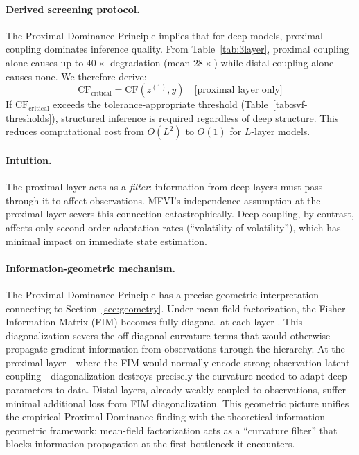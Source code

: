 \documentclass[10pt]{article} %
\theoremstyle{plain}
\theoremstyle{definition}
\begin{document}
\paragraph{Derived screening protocol.} The Proximal Dominance Principle implies that for deep models, proximal coupling dominates inference quality. From Table~\ref{tab:3layer}, proximal coupling alone causes up to $40\times$ degradation (mean $28\times$) while distal coupling alone causes none. We therefore derive:
\begin{equation}
\text{CF}_{\text{critical}} = \text{CF}(z^{(1)}, y) \quad \text{[proximal layer only]}
\end{equation}
If $\text{CF}_{\text{critical}}$ exceeds the tolerance-appropriate threshold (Table~\ref{tab:svf-thresholds}), structured inference is required regardless of deep structure. This reduces computational cost from $O(L^2)$ to $O(1)$ for $L$-layer models.

\paragraph{Intuition.} The proximal layer acts as a \emph{filter}: information from deep layers must pass through it to affect observations. MFVI's independence assumption at the proximal layer severs this connection catastrophically. Deep coupling, by contrast, affects only second-order adaptation rates (``volatility of volatility''), which has minimal impact on immediate state estimation.

\paragraph{Information-geometric mechanism.} The Proximal Dominance Principle has a precise geometric interpretation connecting to Section~\ref{sec:geometry}. Under mean-field factorization, the Fisher Information Matrix (FIM) becomes fully diagonal at each layer \citep{amari2016information}. This diagonalization severs the off-diagonal curvature terms that would otherwise propagate gradient information from observations through the hierarchy. At the proximal layer---where the FIM would normally encode strong observation-latent coupling---diagonalization destroys precisely the curvature needed to adapt deep parameters to data. Distal layers, already weakly coupled to observations, suffer minimal additional loss from FIM diagonalization. This geometric picture unifies the empirical Proximal Dominance finding with the theoretical information-geometric framework: mean-field factorization acts as a ``curvature filter'' that blocks information propagation at the first bottleneck it encounters.
\end{document}
